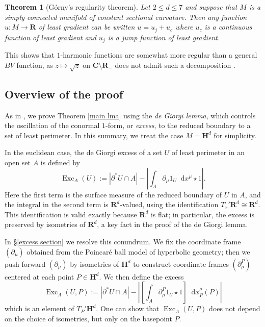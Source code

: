 \documentclass[reqno,11pt]{amsart}
\newcommand{\RR}{\mathbf{R}}
\newcommand{\CC}{\mathbf{C}}
\newcommand{\Hyp}{\mathbf H}
\DeclareMathOperator{\Exc}{Exc}
\newcommand*\dif{\mathop{}\!\mathrm{d}}
\newcommand{\dfn}[1]{\emph{#1}\index{#1}}
\newtheorem{theorem}{Theorem}[section]
\theoremstyle{definition}
\numberwithin{equation}{section}
\begin{document}
\begin{theorem}[G\'orny's regularity theorem]
Let $2 \leq d \leq 7$ and suppose that $M$ is a simply connected manifold of constant sectional curvature.
Then any function $u: M \to \RR$ of least gradient can be written $u = u_j + u_c$ where $u_c$ is a continuous function of least gradient and $u_j$ is a jump function of least gradient.
\end{theorem}

This shows that $1$-harmonic functions are somewhat more regular than a general $BV$ function, as $z \mapsto \sqrt z$ on $\CC \setminus \RR_-$ does not admit such a decomposition \cite[Example 4.1]{Ambrosio2000FunctionsOB}.


\subsection{Overview of the proof}
As in \cite{Miranda66, Giusti77}, we prove Theorem \ref{main lma} using the \dfn{de Giorgi lemma}, which controls the oscillation of the conormal $1$-form, or \dfn{excess}, to the reduced boundary to a set of least perimeter.
In this summary, we treat the case $M = \Hyp^d$ for simplicity.

In the euclidean case, the de Giorgi excess of a set $U$ of least perimeter in an open set $A$ is defined by
$$\Exc_A(U) := |\partial^* U \cap A| - \left|\int_A \partial_\mu 1_U \dif x^\mu \star 1\right|.$$
Here the first term is the surface measure of the reduced boundary of $U$ in $A$, and the integral in the second term is $\RR^d$-valued, using the identification $T_x'\RR^d \cong \RR^d$.
This identification is valid exactly because $\RR^d$ is flat; in particular, the excess is preserved by isometries of $\RR^d$, a key fact in the proof of the de Giorgi lemma.

In \S\ref{excess section} we resolve this conundrum.
We fix the coordinate frame $(\partial_\mu)$ obtained from the Poincar\'e ball model of hyperbolic geometry; then we push forward $(\partial_\mu)$ by isometries of $\Hyp^d$ to construct coordinate frames $(\partial_\mu^P)$ centered at each point $P \in \Hyp^d$.
We then define the excess
\begin{equation}\label{excess definition prelim}
\Exc_A(U, P) := |\partial^* U \cap A| - \left|\left[\int_A \partial_\mu^P 1_U \star 1\right] \dif x^\mu_P(P)\right|
\end{equation}
which is an element of $T_P' \Hyp^d$.
One can show that $\Exc_A(U, P)$ does not depend on the choice of isometries, but only on the basepoint $P$.
\end{document}
